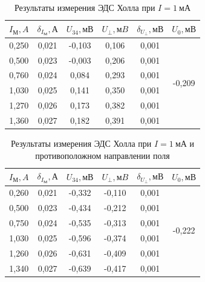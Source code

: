 \documentclass[a4paper, 12pt]{article}
\begin{document}
\begin{table}[h!]
\begin{center}
\begin{tabular}{|c|c|c|c|c|c|}
\hline
$I_М, A$  & $\delta_{I_М}, А$ & $U_{34}, мВ$ & $U_{\perp}, мB$ & $\delta_{U_{\perp}}, мВ$ & $U_0, мВ$                     \\ \hline
0,250 & 0,021 & -0,103  & 0,106    & 0,001  & \multirow{6}{*}{-0,209} \\ \cline{1-5}
0,500 & 0,023 & -0,003  & 0,206    & 0,001  &                         \\ \cline{1-5}
0,760 & 0,024 & 0,084   & 0,293    & 0,001  &                         \\ \cline{1-5}
1,030 & 0,025 & 0,141   & 0,350    & 0,001  &                         \\ \cline{1-5}
1,270 & 0,026 & 0,173   & 0,382    & 0,001  &                         \\ \cline{1-5}
1,360 & 0,027 & 0,182   & 0,391    & 0,001  &                         \\ \hline
\end{tabular}
\end{center}
\caption{Результаты измерения ЭДС Холла при $I = 1~мА$}
\label{tab8}
\end{table}

\begin{table}[h!]
\begin{center}
\begin{tabular}{|c|c|c|c|c|c|}
\hline
$I_М, A$  & $\delta_{I_М}, А$ & $U_{34}, мВ$ & $U_{\perp}, мB$ & $\delta_{U_{\perp}}, мВ$ & $U_0, мВ$                     \\ \hline
0,260 & 0,021 & -0,332  & -0,110   & 0,001  & \multirow{6}{*}{-0,222} \\ \cline{1-5}
0,500 & 0,023 & -0,434  & -0,212   & 0,001  &                         \\ \cline{1-5}
0,750 & 0,024 & -0,535  & -0,313   & 0,001  &                         \\ \cline{1-5}
1,030 & 0,025 & -0,596  & -0,374   & 0,001  &                         \\ \cline{1-5}
1,260 & 0,026 & -0,631  & -0,409   & 0,001  &                         \\ \cline{1-5}
1,340 & 0,027 & -0,639  & -0,417   & 0,001  &                         \\ \hline
\end{tabular}
\end{center}
\caption{Результаты измерения ЭДС Холла при $I = 1~мА$ и противоположном направлении поля}
\label{tab9}
\end{table}
\end{document}

